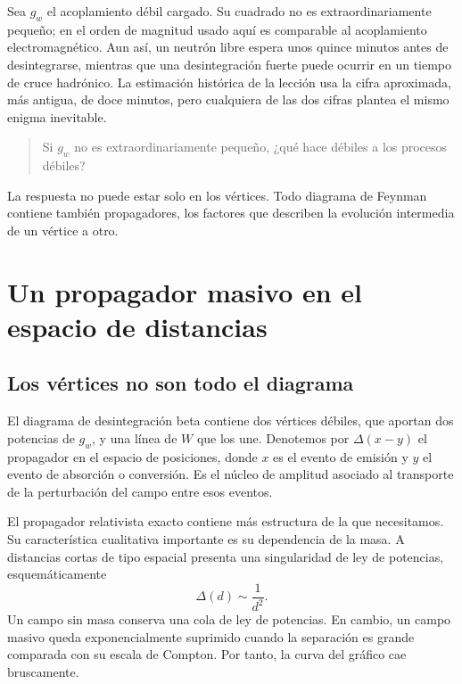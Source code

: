 Sea \(g_w\) el acoplamiento débil cargado. Su cuadrado no es extraordinariamente pequeño; en el orden de magnitud usado aquí es comparable al acoplamiento electromagnético. Aun así, un neutrón libre espera unos quince minutos antes de desintegrarse, mientras que una desintegración fuerte puede ocurrir en un tiempo de cruce hadrónico. La estimación histórica de la lección usa la cifra aproximada, más antigua, de doce minutos, pero cualquiera de las dos cifras plantea el mismo enigma inevitable.
\begin{quote}
Si \(g_w\) no es extraordinariamente pequeño, ¿qué hace débiles a los procesos débiles?
\end{quote}

La respuesta no puede estar solo en los vértices. Todo diagrama de Feynman contiene también propagadores, los factores que describen la evolución intermedia de un vértice a otro.

\section{Un propagador masivo en el espacio de distancias}

\subsection{Los vértices no son todo el diagrama}

El diagrama de desintegración beta contiene dos vértices débiles, que aportan dos potencias de \(g_w\), y una línea de \(W\) que los une. Denotemos por \(\Delta(x-y)\) el propagador en el espacio de posiciones, donde \(x\) es el evento de emisión y \(y\) el evento de absorción o conversión. Es el núcleo de amplitud asociado al transporte de la perturbación del campo entre esos eventos.

El propagador relativista exacto contiene más estructura de la que necesitamos. Su característica cualitativa importante es su dependencia de la masa. A distancias cortas de tipo espacial presenta una singularidad de ley de potencias, esquemáticamente
\begin{equation}
  \Delta(d)\sim\frac1{d^2}.
\end{equation}
Un campo sin masa conserva una cola de ley de potencias. En cambio, un campo masivo queda exponencialmente suprimido cuando la separación es grande comparada con su escala de Compton. Por tanto, la curva del gráfico cae bruscamente.


